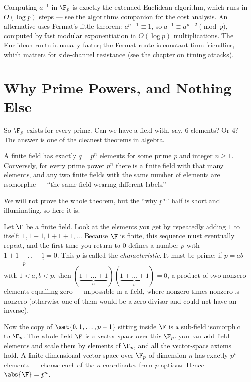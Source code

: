 \begin{connectionbox}
Computing $a^{-1}$ in $\F_p$ is exactly the extended Euclidean algorithm,
which runs in $O(\log p)$ steps --- see the algorithms companion for the cost
analysis. An alternative uses Fermat's little theorem: $a^{p-1}\equiv 1$, so
$a^{-1} \equiv a^{p-2} \pmod p$, computed by fast modular exponentiation in
$O(\log p)$ multiplications. The Euclidean route is usually faster; the
Fermat route is constant-time-friendlier, which matters for side-channel
resistance (see the chapter on timing attacks).
\end{connectionbox}

\section{Why Prime Powers, and Nothing Else}
\label{ch06:prime-powers}

So $\F_p$ exists for every prime. Can we have a field with, say, $6$
elements? Or $4$? The answer is one of the cleanest theorems in algebra.

\begin{theorem}
\label{ch06:thm-classification}
A finite field has exactly $q = p^n$ elements for some prime $p$ and integer
$n \geq 1$. Conversely, for every prime power $p^n$ there is a finite field
with that many elements, and any two finite fields with the same number of
elements are isomorphic --- ``the same field wearing different labels.''
\end{theorem}

We will not prove the whole theorem, but the ``why $p^n$'' half is short and
illuminating, so here it is.

\begin{whybox}
Let $\F$ be a finite field. Look at the elements you get by repeatedly adding
$1$ to itself: $1, 1+1, 1+1+1, \dots$ Because $\F$ is finite, this sequence
must eventually repeat, and the first time you return to $0$ defines a number
$p$ with $\underbrace{1+1+\dots+1}_{p}=0$. This $p$ is called the
\emph{characteristic}. It must be prime: if $p = ab$ with $1<a,b<p$, then
$(\underbrace{1+\dots+1}_{a})(\underbrace{1+\dots+1}_{b}) = 0$, a product of
two nonzero elements equalling zero --- impossible in a field, where nonzero
times nonzero is nonzero (otherwise one of them would be a zero-divisor and
could not have an inverse).

Now the copy of $\set{0,1,\dots,p-1}$ sitting inside $\F$ is a sub-field
isomorphic to $\F_p$. The whole field $\F$ is a vector space over this
$\F_p$: you can add field elements and scale them by elements of $\F_p$, and
all the vector-space axioms hold. A finite-dimensional vector space over
$\F_p$ of dimension $n$ has exactly $p^n$ elements --- choose each of the $n$
coordinates from $p$ options. Hence $\abs{\F} = p^n$.
\end{whybox}

